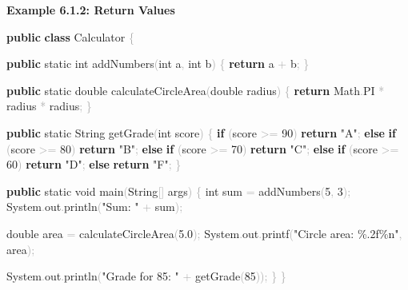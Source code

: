 \documentclass[
  justified,
  openright,
]{tufte-book}
\newcommand{\KeywordTok}[1]{\textcolor{CodeKeyword}{\textbf{#1}}}  %
\newcommand{\StringTok}[1]{\textcolor{CodeString}{#1}}              %
\newcommand{\CodeNumTok}[1]{\textcolor{CodeNumber}{#1}}             %
\newcommand{\CodeFuncTok}[1]{\textcolor{CodeKeyword}{#1}}           %
\newcommand{\CodeTypeTok}[1]{\textcolor{CodeType}{#1}}              %
\newcommand{\OperatorTok}[1]{\textcolor{DarkGray}{#1}}              %
\newenvironment{Shaded}{%
  \begin{mdframed}[style=TufteCode]%
}{%
  \end{mdframed}%
}
\begin{document}
\textbf{Example 6.1.2: Return Values}

\begin{Shaded}
\begin{Highlighting}[]
\KeywordTok{public} \KeywordTok{class} Calculator \OperatorTok{\{}
 
    \KeywordTok{public} \CodeTypeTok{static} \CodeTypeTok{int} \CodeFuncTok{addNumbers}\OperatorTok{(}\CodeTypeTok{int} a\OperatorTok{,} \CodeTypeTok{int} b\OperatorTok{)} \OperatorTok{\{}
        \KeywordTok{return} a \OperatorTok{+} b\OperatorTok{;}
    \OperatorTok{\}}
 
    \KeywordTok{public} \CodeTypeTok{static} \CodeTypeTok{double} \CodeFuncTok{calculateCircleArea}\OperatorTok{(}\CodeTypeTok{double} radius\OperatorTok{)} \OperatorTok{\{}
        \KeywordTok{return} Math\OperatorTok{.}\CodeFuncTok{PI} \OperatorTok{*} radius \OperatorTok{*} radius\OperatorTok{;}
    \OperatorTok{\}}
 
    \KeywordTok{public} \CodeTypeTok{static} String \CodeFuncTok{getGrade}\OperatorTok{(}\CodeTypeTok{int} score\OperatorTok{)} \OperatorTok{\{}
        \KeywordTok{if} \OperatorTok{(}score \OperatorTok{\textgreater{}=} \CodeNumTok{90}\OperatorTok{)} \KeywordTok{return} \StringTok{"A"}\OperatorTok{;}
        \KeywordTok{else} \KeywordTok{if} \OperatorTok{(}score \OperatorTok{\textgreater{}=} \CodeNumTok{80}\OperatorTok{)} \KeywordTok{return} \StringTok{"B"}\OperatorTok{;}
        \KeywordTok{else} \KeywordTok{if} \OperatorTok{(}score \OperatorTok{\textgreater{}=} \CodeNumTok{70}\OperatorTok{)} \KeywordTok{return} \StringTok{"C"}\OperatorTok{;}
        \KeywordTok{else} \KeywordTok{if} \OperatorTok{(}score \OperatorTok{\textgreater{}=} \CodeNumTok{60}\OperatorTok{)} \KeywordTok{return} \StringTok{"D"}\OperatorTok{;}
        \KeywordTok{else} \KeywordTok{return} \StringTok{"F"}\OperatorTok{;}
    \OperatorTok{\}}
 
    \KeywordTok{public} \CodeTypeTok{static} \CodeTypeTok{void} \CodeFuncTok{main}\OperatorTok{(}String\OperatorTok{[]} args\OperatorTok{)} \OperatorTok{\{}
        \CodeTypeTok{int} sum \OperatorTok{=} \CodeFuncTok{addNumbers}\OperatorTok{(}\CodeNumTok{5}\OperatorTok{,} \CodeNumTok{3}\OperatorTok{);}
        System\OperatorTok{.}\CodeFuncTok{out}\OperatorTok{.}\CodeFuncTok{println}\OperatorTok{(}\StringTok{"Sum: "} \OperatorTok{+} sum\OperatorTok{);}
 
        \CodeTypeTok{double} area \OperatorTok{=} \CodeFuncTok{calculateCircleArea}\OperatorTok{(}\CodeNumTok{5.0}\OperatorTok{);}
        System\OperatorTok{.}\CodeFuncTok{out}\OperatorTok{.}\CodeFuncTok{printf}\OperatorTok{(}\StringTok{"Circle area: }\StringTok{\%.2f\%n}\StringTok{"}\OperatorTok{,} area\OperatorTok{);}
 
        System\OperatorTok{.}\CodeFuncTok{out}\OperatorTok{.}\CodeFuncTok{println}\OperatorTok{(}\StringTok{"Grade for 85: "} \OperatorTok{+} \CodeFuncTok{getGrade}\OperatorTok{(}\CodeNumTok{85}\OperatorTok{));}
    \OperatorTok{\}}
\OperatorTok{\}}
\end{Highlighting}
\end{Shaded}
\end{document}
